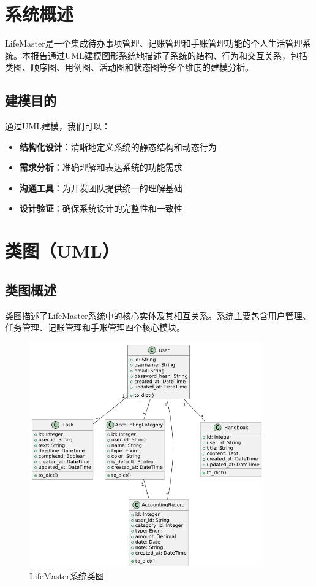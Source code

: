 \documentclass[a4paper]{article}
\begin{document}
\section{系统概述}

LifeMaster是一个集成待办事项管理、记账管理和手账管理功能的个人生活管理系统。本报告通过UML建模图形系统地描述了系统的结构、行为和交互关系，包括类图、顺序图、用例图、活动图和状态图等多个维度的建模分析。

\subsection{建模目的}

通过UML建模，我们可以：

\begin{itemize}
    \item \textbf{结构化设计}：清晰地定义系统的静态结构和动态行为
    \item \textbf{需求分析}：准确理解和表达系统的功能需求
    \item \textbf{沟通工具}：为开发团队提供统一的理解基础
    \item \textbf{设计验证}：确保系统设计的完整性和一致性
\end{itemize}

\section{类图（UML）}

\subsection{类图概述}

类图描述了LifeMaster系统中的核心实体及其相互关系。系统主要包含用户管理、任务管理、记账管理和手账管理四个核心模块。

\begin{figure}[H]
\centering
\includegraphics[width=0.9\textwidth]{img/class_diagram.png}
\caption{LifeMaster系统类图}
\end{figure}
\end{document}
